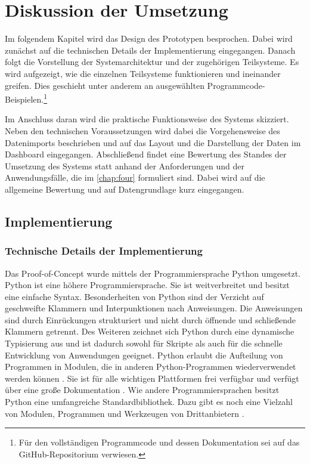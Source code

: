 \chapter{Diskussion der Umsetzung}
\label{chap:five}
Im folgendem Kapitel wird das Design des Prototypen besprochen. Dabei wird zunächst auf die technischen Details der
Implementierung eingegangen. Danach folgt die Vorstellung der Systemarchitektur und der zugehörigen Teilsysteme.
Es wird aufgezeigt, wie die einzelnen Teilsysteme funktionieren und ineinander greifen. Dies geschieht
unter anderem an ausgewählten Programmcode-Beispielen.\footnote{Für den vollständigen Programmcode und dessen Dokumentation sei auf das GitHub-Repositorium verwiesen.} 

Im Anschluss daran wird die praktische Funktionsweise des Systems skizziert. Neben den technischen Voraussetzungen wird dabei 
die Vorgehensweise des Datenimports beschrieben und auf das Layout und die Darstellung der Daten im Dashboard eingegangen. 
Abschließend findet eine Bewertung des Standes der Umsetzung des Systems statt anhand der Anforderungen und der Anwendungsfälle, die im \autoref{chap:four} formuliert sind.
Dabei wird auf die allgemeine Bewertung und auf Datengrundlage kurz eingegangen.


\section{Implementierung}
    \subsection{Technische Details der Implementierung}
    Das Proof-of-Concept wurde mittels der Programmiersprache Python umgesetzt.
    Python ist eine höhere Programmiersprache. Sie ist weitverbreitet \cite[vgl.][]{loukides_where_2021} und besitzt
    eine einfache Syntax. Besonderheiten von Python sind der Verzicht auf geschweifte Klammern und Interpunktionen nach Anweisungen.
    Die Anweisungen sind durch Einrückungen strukturiert und nicht durch öffnende und schließende Klammern
    getrennt. Des Weiteren zeichnet sich Python durch eine dynamische Typisierung aus und ist dadurch sowohl für Skripte als auch 
    für die schnelle Entwicklung von Anwendungen geeignet. Python erlaubt die Aufteilung von Programmen in Modulen, die in anderen Python-Programmen wiederverwendet werden können
    \cite[vgl.][]{python_6_2021}.
    Sie ist für alle wichtigen Plattformen frei verfügbar und verfügt über eine große Dokumentation \cite[vgl.][]{python_welcome_2021}.
    Wie andere Programmiersprachen besitzt Python eine umfangreiche Standardbibliothek. 
    Dazu gibt es noch eine Vielzahl von Modulen, Programmen und Werkzeugen von Drittanbietern \cite[vgl.][]{python_pypi_2021}.
    
